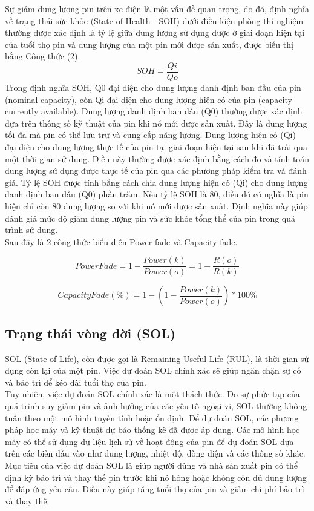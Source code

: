 \documentclass[a4paper,13pt]{article}
\theoremstyle{mytheor}
\begin{document}
Sự giảm dung lượng pin trên xe điện là một vấn đề quan trọng, do đó, định nghĩa về trạng thái sức khỏe (State of Health - SOH) dưới điều kiện phòng thí nghiệm thường được xác định là tỷ lệ giữa dung lượng sử dụng được ở giai đoạn hiện tại của tuổi thọ pin và dung lượng của một pin mới được sản xuất, được biểu thị bằng Công thức (2).\\
\[SOH = \frac{Qi}{Qo}\]
Trong định nghĩa SOH, Q0 đại diện cho dung lượng danh định ban đầu của pin (nominal capacity), còn Qi đại diện cho dung lượng hiện có của pin (capacity currently available).
Dung lượng danh định ban đầu (Q0) thường được xác định dựa trên thông số kỹ thuật của pin khi nó mới được sản xuất. Đây là dung lượng tối đa mà pin có thể lưu trữ và cung cấp năng lượng.
Dung lượng hiện có (Qi) đại diện cho dung lượng thực tế của pin tại giai đoạn hiện tại sau khi đã trải qua một thời gian sử dụng. Điều này thường được xác định bằng cách đo và tính toán dung lượng sử dụng được thực tế của pin qua các phương pháp kiểm tra và đánh giá.
Tỷ lệ SOH được tính bằng cách chia dung lượng hiện có (Qi) cho dung lượng danh định ban đầu (Q0) phần trăm. Nếu tỷ lệ SOH là 80, điều đó có nghĩa là pin hiện chỉ còn 80 dung lượng so với khi nó mới được sản xuất.
Định nghĩa này giúp đánh giá mức độ giảm dung lượng pin và sức khỏe tổng thể của pin trong quá trình sử dụng.\\
Sau đây là 2 công thức biểu diễn Power fade và Capacity fade. 

\[Power Fade = 1 - \frac{Power(k)}{Power(o)} = 1 - \frac{R(o)}{R(k)}\]

\[Capacity Fade(\%) = 1 - (1 - \frac{Power(k)}{Power(o)})*100 \%\]

\subsection{Trạng thái vòng đời (SOL)}

SOL (State of Life), còn được gọi là Remaining Useful Life (RUL), là thời gian sử dụng còn lại của một pin. Việc dự đoán SOL chính xác sẽ giúp ngăn chặn sự cố và bảo trì để kéo dài tuổi thọ của pin.\\
Tuy nhiên, việc dự đoán SOL chính xác là một thách thức. Do sự phức tạp của quá trình suy giảm pin và ảnh hưởng của các yếu tố ngoại vi, SOL thường không tuân theo một mô hình tuyến tính hoặc ổn định. Để dự đoán SOL, các phương pháp học máy và kỹ thuật dự báo thống kê đã được áp dụng. Các mô hình học máy có thể sử dụng dữ liệu lịch sử về hoạt động của pin để dự đoán SOL dựa trên các biến đầu vào như dung lượng, nhiệt độ, dòng điện và các thông số khác.\\
Mục tiêu của việc dự đoán SOL là giúp người dùng và nhà sản xuất pin có thể định kỳ bảo trì và thay thế pin trước khi nó hỏng hoặc không còn đủ dung lượng để đáp ứng yêu cầu. Điều này giúp tăng tuổi thọ của pin và giảm chi phí bảo trì và thay thế.\\
\end{document}
